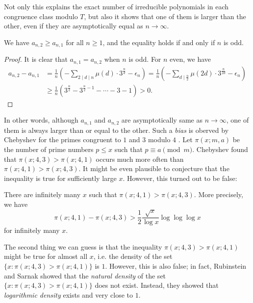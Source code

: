 Not only this explains the exact number of irreducible polynomials in each congruence class modulo $T$, but also it shows that one of them is larger than the other, even if they are asymptotically equal as $n \to \infty$.
\begin{corollary}
    We have $a_{n,2} \ge a_{n,1}$ for all $n \ge 1$, and the equality holds if and only if $n$ is odd.
\end{corollary}
\begin{proof}
    It is clear that $a_{n,1} = a_{n,2}$ when $n$ is odd.
    For $n$ even, we have
    \begin{align*}
    a_{n,2} - a_{n,1} &= \frac{1}{n} \left(- \sum_{2 \mid d \mid n} \mu(d)\cdot 3^{\frac{n}{d}} - \epsilon_n\right) = \frac{1}{n} \left(-\sum_{d \mid \frac{n}{2}} \mu(2d) \cdot 3^{\frac{n}{2d}} - \epsilon_n\right) \\
    &\ge \frac{1}{n} \left(3^{\frac{n}{2}} - 3^{\frac{n}{2} - 1} - \cdots - 3 - 1\right) > 0.
    \end{align*}
\end{proof}

In other words, although $a_{n,1}$ and $a_{n,2}$ are asymptotically same as $n \to \infty$, one of them is always larger than or equal to the other.
Such a \emph{bias} is oberved by Chebyshev for the primes congruent to $1$ and $3$ modulo $4$ \cite{chebyshev1853lettre}.
Let $\pi(x;m,a)$ be the number of prime numbers $p \le x$ such that $p \equiv a \pmod{m}$.
Chebyshev found that $\pi(x;4, 3) > \pi(x;4,1)$ occurs much more often than $\pi(x;4,1) > \pi(x;4,3)$.
It might be even plausible to conjecture that the inequality is true for sufficiently large $x$.
However, this turned out to be false:
\begin{theorem}
    There are infinitely many $x$ such that $\pi(x;4,1) > \pi(x;4,3)$.
    More precisely, we have
    \[
    \pi(x;4,1) - \pi(x;4,3) > \frac{1}{2} \frac{\sqrt{x}}{\log x} \log \log \log x
    \]
    for infinitely many $x$.
\end{theorem}

The second thing we can guess is that the inequality $\pi(x;4,3) > \pi(x;4,1)$ might be true for almost all $x$, i.e. the density of the set $\{x : \pi(x;4,3) > \pi(x;4,1)\}$ is $1$.
However, this is also false; in fact, Rubinstein and Sarnak \cite{rubinstein1994chebyshev} showed that the \emph{natural density} of the set $\{x : \pi(x;4,3) > \pi(x;4,1)\}$ does not exist.
Instead, they showed that \emph{logarithmic density} exists and very close to $1$.
\begin{theorem}
    
\end{theorem}

